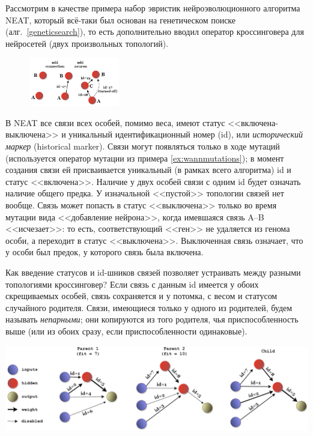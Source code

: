 \begin{example}
Рассмотрим в качестве примера набор эвристик нейроэволюционного алгоритма NEAT, который всё-таки был основан на генетическом поиске (алг.~\ref{geneticsearch}), то есть дополнительно вводил оператор кроссинговера для нейросетей (двух произвольных топологий).

\begin{figure}
\centering
\vspace{-0.5cm}
\includegraphics[width=0.35\textwidth]{Images/neatmutation.png}
\vspace{-0.7cm}
\end{figure}

В NEAT все связи всех особей, помимо веса, имеют статус <<включена-выключена>> и уникальный идентификационный номер (id), или \emph{исторический маркер} (historical marker). Связи могут появляться только в ходе мутаций (используется оператор мутации из примера \ref{ex:wannmutations}); в момент создания связи ей присваивается уникальный (в рамках всего алгоритма) id и статус <<включена>>. Наличие у двух особей связи с одним id будет означать наличие общего предка. У изначальной <<пустой>> топологии связей нет вообще. Связь может попасть в статус <<выключена>> только во время мутации вида <<добавление нейрона>>, когда имевшаяся связь A--B <<исчезает>>: то есть, соответствующий <<ген>> не удаляется из генома особи, а переходит в статус <<выключена>>. Выключенная связь означает, что у особи был предок, у которого связь была включена.

Как введение статусов и id-шников связей позволяет устраивать между разными топологиями кроссинговер? Если связь с данным id имеется у обоих скрещиваемых особей, связь сохраняется и у потомка, с весом и статусом случайного родителя. Связи, имеющиеся только у одного из родителей, будем называть \emph{непарными}; они копируются из того родителя, чья приспособленность выше (или из обоих сразу, если приспособленности одинаковые).

\begin{center}
    \includegraphics[width=\textwidth]{Images/neat}
\end{center}


\end{example}
